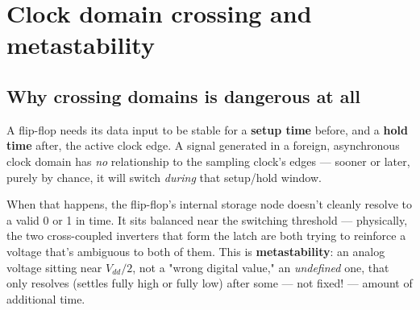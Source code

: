 \documentclass[12pt]{article}
\begin{document}
\clearpage
\section{Clock domain crossing and metastability}
\label{sec:cdc}

\subsection{Why crossing domains is dangerous at all}

A flip-flop needs its data input to be stable for a \textbf{setup time}
before, and a \textbf{hold time} after, the active clock edge. A signal
generated in a foreign, asynchronous clock domain has \emph{no}
relationship to the sampling clock's edges — sooner or later, purely by
chance, it will switch \emph{during} that setup/hold window.

When that happens, the flip-flop's internal storage node doesn't cleanly
resolve to a valid 0 or 1 in time. It sits balanced near the switching
threshold — physically, the two cross-coupled inverters that form the
latch are both trying to reinforce a voltage that's ambiguous to both of
them. This is \textbf{metastability}: an analog voltage sitting near
$V_{dd}/2$, not a "wrong digital value," an \emph{undefined} one, that only
resolves (settles fully high or fully low) after some — not fixed! —
amount of additional time.
\end{document}
